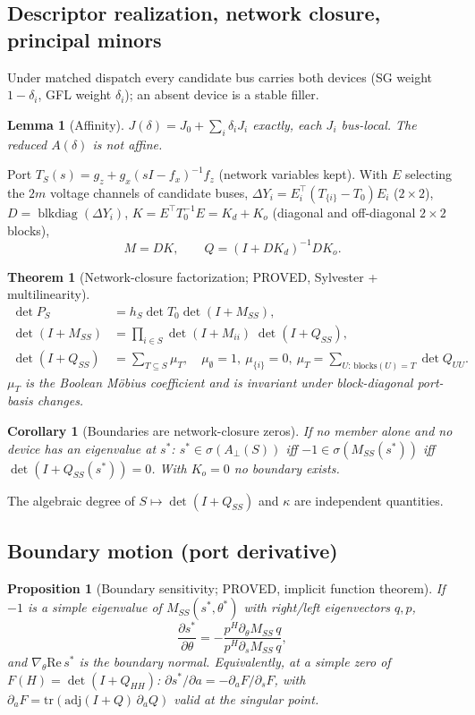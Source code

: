 \documentclass[10pt,a4paper]{article}
\newtheorem{theorem}{Theorem}
\newtheorem{proposition}{Proposition}
\newtheorem{lemma}{Lemma}
\newtheorem{corollary}{Corollary}
\theoremstyle{definition}
\newcommand{\Aperp}{A_\perp}
\DeclareMathOperator{\blkdiag}{blkdiag}
\newcommand{\status}[1]{\textsf{\small #1}}
\begin{document}
\subsection{Descriptor realization, network closure, principal minors}
Under matched dispatch every candidate bus carries both devices (SG weight $1-\delta_i$, GFL weight
$\delta_i$); an absent device is a stable filler.
\begin{lemma}[Affinity]
$J(\delta)=J_0+\sum_i\delta_iJ_i$ exactly, each $J_i$ bus-local. The reduced $A(\delta)$ is \emph{not} affine.
\end{lemma}
Port $T_S(s)=g_z+g_x(sI-f_x)^{-1}f_z$ (network variables kept). With $E$ selecting the $2m$ voltage
channels of candidate buses, $\Delta Y_i=E_i^\top(T_{\{i\}}-T_0)E_i$ ($2\times2$), $D=\blkdiag(\Delta Y_i)$,
$K=E^\top T_0^{-1}E=K_d+K_o$ (diagonal and off-diagonal $2\times2$ blocks),
\begin{equation} M=DK,\qquad Q=(I+DK_d)^{-1}DK_o .\end{equation}
\begin{theorem}[Network-closure factorization; \status{PROVED}, Sylvester + multilinearity]
\begin{align}
\det P_S&=h_S\det T_0\det(I+M_{SS}),\\
\det(I+M_{SS})&=\textstyle\prod_{i\in S}\det(I+M_{ii})\;\det(I+Q_{SS}),\\
\det(I+Q_{SS})&=\textstyle\sum_{T\subseteq S}\mu_T,\quad \mu_\emptyset=1,\ \mu_{\{i\}}=0,\
\mu_T=\sum_{U:\,\mathrm{blocks}(U)=T}\det Q_{UU}.
\end{align}
$\mu_T$ is the Boolean M\"obius coefficient and is invariant under block-diagonal port-basis changes.
\end{theorem}
\begin{corollary}[Boundaries are network-closure zeros]
If no member alone and no device has an eigenvalue at $s^*$: $s^*\in\sigma(\Aperp(S))$ iff
$-1\in\sigma(M_{SS}(s^*))$ iff $\det(I+Q_{SS}(s^*))=0$. With $K_o=0$ no boundary exists.
\end{corollary}
The algebraic degree of $S\mapsto\det(I+Q_{SS})$ and $\kappa$ are independent quantities.

\subsection{Boundary motion (port derivative)}
\begin{proposition}[Boundary sensitivity; \status{PROVED}, implicit function theorem]
If $-1$ is a simple eigenvalue of $M_{SS}(s^*,\theta^*)$ with right/left eigenvectors $q,p$,
\begin{equation}\frac{\partial s^*}{\partial\theta}=-\frac{p^H\partial_\theta M_{SS}\,q}{p^H\partial_sM_{SS}\,q},\end{equation}
and $\nabla_\theta\mathrm{Re}\,s^*$ is the boundary normal. Equivalently, at a simple zero of
$F(H)=\det(I+Q_{HH})$: $\partial s^*/\partial a=-\partial_aF/\partial_sF$, with
$\partial_aF=\mathrm{tr}(\mathrm{adj}(I+Q)\,\partial_aQ)$ valid at the singular point.
\end{proposition}
\end{document}
